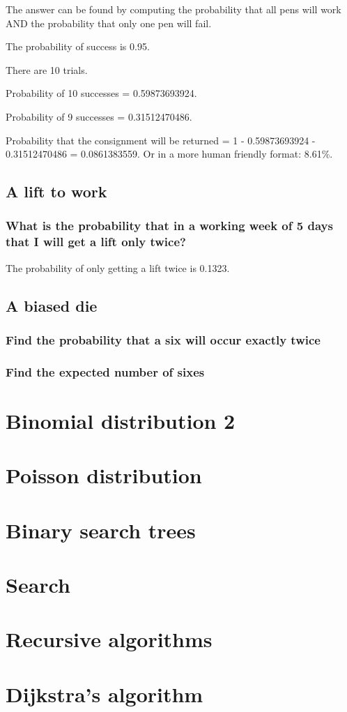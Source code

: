 \documentclass[12pt]{article}
\begin{document}
The answer can be found by computing the probability that all pens will work AND the probability that only one pen will fail.

The probability of success is 0.95.

There are 10 trials.

Probability of 10 successes = 0.59873693924.

Probability of 9 successes = 0.31512470486.

Probability that the consignment will be returned = 1 - 0.59873693924 - 0.31512470486 = 0.0861383559. Or in a more human friendly format: 8.61\%.

\subsection{A lift to work}
\subsubsection{What is the probability that in a working week of 5 days that I will get a lift only twice?}

The probability of only getting a lift twice is 0.1323.

\subsection{A biased die}

\subsubsection{Find the probability that a six will occur exactly twice}



\subsubsection{Find the expected number of sixes}



\section{Binomial distribution 2}

\section{Poisson distribution}

\section{Binary search trees}

\section{Search}

\section{Recursive algorithms}

\section{Dijkstra's algorithm}
\end{document}
